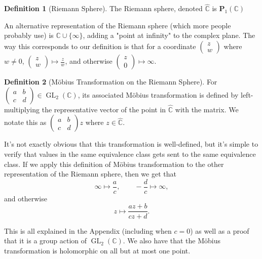 \documentclass{article}
\theoremstyle{definition}
\newtheorem{definition}{Definition}[section]
\theoremstyle{definition}
\theoremstyle{definition}
\newcommand{\GL}{\operatorname{GL}}
\newcommand{\C}{\mathbb{C}}
\newcommand{\Mabcd}{\begin{pmatrix} a&b\\c&d \end{pmatrix}}
\begin{document}
\begin{definition} [Riemann Sphere]
The Riemann sphere, denoted $\hat{\mathbb{C}}$ is $\boldsymbol{P}_1(\mathbb{C})$
\end{definition}

An alternative representation of the Riemann sphere (which more people probably use) is $\mathbb{C}\cup \{\infty\}$, adding a "point at infinity" to the complex plane. The way this corresponds to our definition is that for a coordinate $\begin{pmatrix}z\\w\end{pmatrix}$ where $w\neq 0$, $\begin{pmatrix}z\\w\end{pmatrix} \mapsto \frac{z}{w}$, and otherwise $\begin{pmatrix}z\\0\end{pmatrix}\mapsto \infty$.

\begin{definition} [M\"{o}bius Transformation on the Riemann Sphere]
    For $\Mabcd\in\GL_2(\C)$, its associated M\"{o}bius transformation is defined by left-multiplying the representative vector of the point in  $\hat{\mathbb{C}}$ with the matrix. We notate this as $\Mabcd z$ where $z\in \hat{\mathbb{C}}$.
\end{definition}
It's not exactly obvious that this transformation is well-defined, but it's simple to verify that values in the same equivalence class gets sent to the same equivalence class.
\newline\newline
If we apply this definition of M\"{o}bius transformation to the other representation of the Riemann sphere, then we get that 
$$\infty\mapsto\frac{a}{c},\qquad -\frac{d}{c}\mapsto\infty,$$
and otherwise $$z\mapsto\frac{az+b}{cz+d}.$$

This is all explained in the Appendix (including when $c=0$) as well as a proof that it is a group action of $\GL_2(\C)$.
We also have that the M\"{o}bius transformation is holomorphic on all but at most one point.
\end{document}
